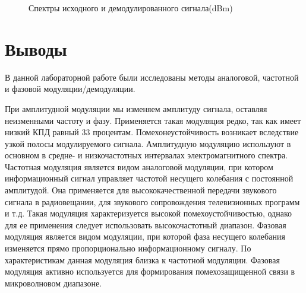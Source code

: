 \documentclass[a4paper,14pt]{extarticle}
\begin{document}
\begin{figure}[H]
\caption{Спектры исходного и демодулированного сигнала(dBm)}
\label{31}
\end{figure}


\section{Выводы}

В данной лабораторной работе были исследованы методы аналоговой, частотной и фазовой модуляции/демодуляции.

При амплитудной модуляции мы изменяем амплитуду сигнала, оставляя неизменными частоту и фазу. Применяется такая модуляция редко, так как имеет низкий КПД равный 33 процентам. Помехонеустойчивость возникает вследствие узкой полосы модулируемого сигнала. Амплитудную модуляцию используют в основном в средне- и низкочастотных интервалах электромагнитного спектра.
Частотная модуляция является видом аналоговой модуляции, при котором информационный сигнал управляет частотой несущего колебания с постоянной амплитудой. Она применяется для высококачественной передачи звукового сигнала в радиовещании, для звукового сопровождения телевизионных программ и т.д. Такая модуляция характеризуется высокой помехоустойчивостью, однако для ее применения следует использовать высокочастотный диапазон.
Фазовая модуляция является видом модуляции, при которой фаза несущего колебания изменяется прямо пропорционально информационному сигналу. По характеристикам данная модуляция близка к частотной модуляции. Фазовая модуляция активно используется для формирования помехозащищенной связи в микроволновом диапазоне.
\end{document}

